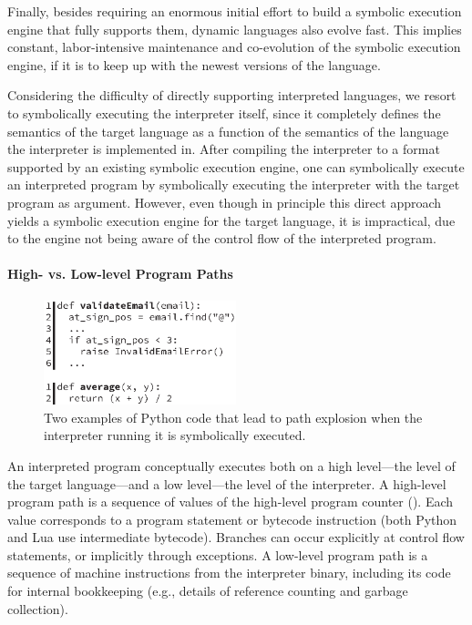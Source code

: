 Finally, besides requiring an enormous initial effort to build a symbolic execution engine that fully supports them, dynamic languages also evolve fast. This implies constant, labor-intensive maintenance and co-evolution of the symbolic execution engine, if it is to keep up with the newest versions of the language.

Considering the difficulty of directly supporting interpreted languages, we resort to symbolically executing the interpreter itself, since it completely defines the semantics of the target language as a function of the semantics of the language the interpreter is implemented in.
%
After compiling the interpreter to a format supported by an existing symbolic execution engine, one can symbolically execute an interpreted program by symbolically executing the interpreter with the target program as argument.
%
However, even though in principle this direct approach yields a symbolic execution engine for the target language, it is impractical, due to the engine not being aware of the control flow of the interpreted program.

\paragraph{High- vs. Low-level Program Paths}

\begin{figure}
  \centering
  \includegraphics[width=2.2in]{figures/chef/running-example}
  \caption{Two examples of Python code that lead to path explosion when the interpreter running it is symbolically executed.}
  \label{fig:running-examples}
\end{figure}


An interpreted program conceptually executes both on a high level---the level of the target language---and a low level---the level of the interpreter.
%
A high-level program path is a sequence of values of the high-level program counter (\hlpc). Each \hlpc value corresponds to a program statement or bytecode instruction (both Python and Lua use intermediate bytecode).  Branches can occur explicitly at control flow statements, or implicitly through exceptions.
%
A low-level program path is a sequence of machine instructions from the interpreter binary, including its code for internal bookkeeping (e.g., details of reference counting and garbage collection).

